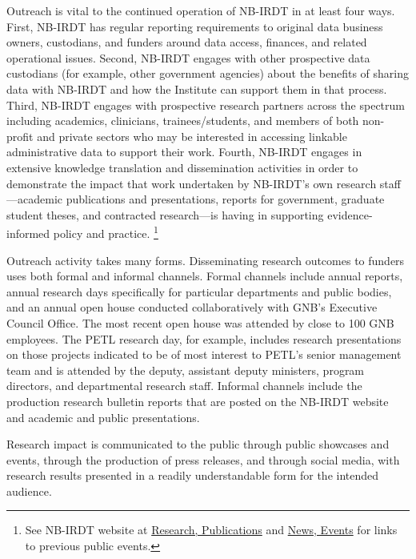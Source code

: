 \documentclass[
]{book}
\begin{document}
Outreach is vital to the continued operation of NB-IRDT in at least four ways. First, NB-IRDT has regular reporting requirements to original data business owners, custodians, and funders around data access, finances, and related operational issues. Second, NB-IRDT engages with other prospective data custodians (for example, other government agencies) about the benefits of sharing data with NB-IRDT and how the Institute can support them in that process. Third, NB-IRDT engages with prospective research partners across the spectrum including academics, clinicians, trainees/students, and members of both non-profit and private sectors who may be interested in accessing linkable administrative data to support their work. Fourth, NB-IRDT engages in extensive knowledge translation and dissemination activities in order to demonstrate the impact that work undertaken by NB-IRDT's own research staff---academic publications and presentations, reports for government, graduate student theses, and contracted research---is having in supporting evidence-informed policy and practice. \footnote{See NB-IRDT website at \href{https://www.nbirdt.ca/publications}{Research, Publications} and \href{https://www.nbirdt.ca/nbirdt-events}{News, Events} for links to previous public events.}

Outreach activity takes many forms. Disseminating research outcomes to funders uses both formal and informal channels. Formal channels include annual reports, annual research days specifically for particular departments and public bodies, and an annual open house conducted collaboratively with GNB's Executive Council Office. The most recent open house was attended by close to 100 GNB employees. The PETL research day, for example, includes research presentations on those projects indicated to be of most interest to PETL's senior management team and is attended by the deputy, assistant deputy ministers, program directors, and departmental research staff. Informal channels include the production research bulletin reports that are posted on the NB-IRDT website and academic and public presentations.

Research impact is communicated to the public through public showcases and events, through the production of press releases, and through social media, with research results presented in a readily understandable form for the intended audience.
\end{document}
